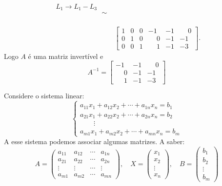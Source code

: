 \begin{exemplo}
\begin{solucao}
\begin{align*}
\begin{array}{l}
                L_1 \to L_1 - L_3\\\phantom{x}\\\phantom{x}
            \end{array}\sim\\
            &\left[
                \begin{array}{ccc|ccc}
                    1 & 0 & 0 & -1 & -1 & \phantom{-}0\\
                    0 & 1 & 0 & \phantom{-}0 & -1 & -1\\
                    0 & 0 & 1 & \phantom{-}1 & -1 & -3
                \end{array}
            \right].
        \end{align*}
        Logo $A$ é uma matriz invertível e
        \[
            A^{-1} = \begin{bmatrix}
                    -1 & -1 & \phantom{-}0\\
                    \phantom{-}0 & -1 & -1\\
                    \phantom{-}1 & -1 & -3
                \end{bmatrix}
        \]
    \end{solucao}
\end{exemplo}
Considere o sistema linear:
\begin{equation}
\begin{cases}
        a_{11}x_1 + a_{12}x_2 + \cdots + a_{1n}x_n = b_1\\
        a_{21}x_1 + a_{22}x_2 + \cdots + a_{2n}x_n = b_2\\
        \qquad \vdots\\
        a_{m1}x_1 + a_{m2}x_2 + \cdots + a_{mn}x_n = b_m
    \end{cases}
\end{equation}
A esse sistema podemos associar algumas matrizes. A saber:
\[
    A = \begin{pmatrix}
        a_{11} & a_{12} & \cdots & a_{1n}\\
        a_{21} & a_{22} & \cdots & a_{2n}\\
        \vdots & \vdots & \cdots & \vdots\\
        a_{m1} & a_{m2} & \cdots & a_{mn}
    \end{pmatrix}, \quad
    X = \begin{pmatrix}
        x_1\\
        x_2\\
        \vdots\\
        x_n
    \end{pmatrix},\quad
    B = \begin{pmatrix}
        b_1\\
        b_2\\
        \vdots\\
        b_m
    \end{pmatrix}
\]

